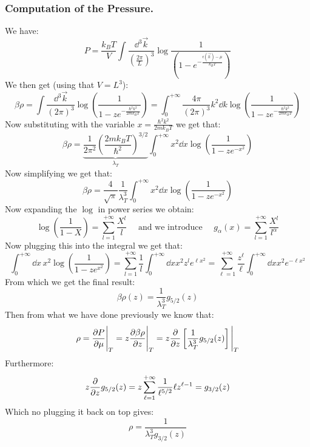 \documentclass[10pt,a4paper]{book}
\begin{document}
\subsubsection{Computation of the Pressure.}
We have:
\[
P = \frac{k_B T }{V}\int \frac{\dd^3 \vec{k}}{\left(\frac{2\pi}{L}\right)^3} \log \frac{1}{\left(1 - e^{- \frac{\epsilon(\vec{k}) - \mu}{k_B T}}\right)}
\]
We then get (using that $V = L^3$):
\[
\beta \rho = \int \frac{\dd^3 \vec{k}}{(2 \pi )^3} \log(\frac{1}{1 - z e^{- \frac{\hbar^2 k^2}{2m k_B T}} }) = \int_0^{+\infty} \frac{4\pi}{(2\pi)^3} k^2 \dd k \log(\frac{1}{1 - z e^{-\frac{\hbar^2 k^2}{2m k_B T}}})
\]
Now substituting with the variable $x = \frac{\hbar^2 k^2}{2m k_B T}$ we get that:
\[
\beta \rho = \underbrace{\frac{1}{2 \pi^2} \left(\frac{2 m k_B T}{\hbar^2}\right)^{3/2}}_{\lambda_T} \int_0^{+\infty} x^2 \dd x \log(\frac{1}{1 - ze^{-x^2}})
\]
Now simplifying we get that:
\[
\beta \rho = \frac{4}{\sqrt{\pi}} \frac{1}{\lambda_T^3} \int_0^{+\infty} x^2 \dd x \log(\frac{1}{1 - z e^{-x^2}})
\]
Now expanding the $\log$ in power series we obtain:
\[
\log(\frac{1}{1 - X}) = \sum_{l = 1}^{+\infty} \frac{X^l}{l} \quad \text{ and we introduce } \quad g_\alpha (x) = \sum_{l = 1}^{+\infty} \frac{X^l}{l^\alpha}
\]
Now plugging this into the integral we get that:
\[
\int_0^{+\infty} \dd x\,  x^2 \log(\frac{1}{1 - ze^{x^2}}) = \sum_{l = 1}^{+\infty} \frac{1}{l} \int_0^{+\infty} \dd{x} x^2 z^l e^{\ell x^2} = \sum_{\ell = 1}^{+\infty} \frac{z^\ell}{\ell} \int_0^{+\infty} \dd{x} x^2 e^{-\ell x^2}
\]
From which we get the final result:
\[
\beta \rho(z) = \frac{1}{\lambda_T^3} g_{5/2}(z)
\]
Then from what we have done previously we know that:
\[
\rho = \pdv{P}{\mu} \Bigg|_T = z \pdv{\beta \rho}{z} \Bigg|_T = z \pdv{}{z}\left[ \frac{1}{\lambda_T^3} g_{5/2}(z) \right] \Bigg|_T 
\]
Furthermore:
\[
z \pdv{}{z} g_{5/2}(z) = z \sum_{\ell = 1}^{+\infty} \frac{1}{\ell^{5/2}} \ell z^{\ell - 1} = g_{3/2}(z)
\]
Which no plugging it back on top gives:
\[
\rho = \frac{1}{\lambda_T^3 g_{3/2}(z)} 
\]
\end{document}
